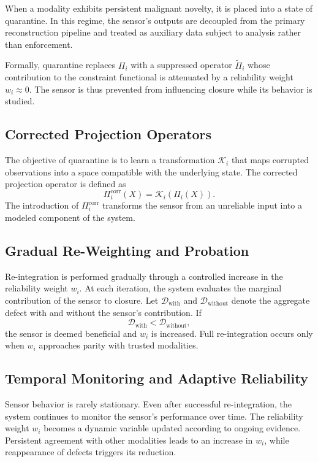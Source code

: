 \documentclass[12pt, oneside]{article}
\begin{document}
When a modality exhibits persistent malignant novelty, it is placed into a state of quarantine. In this regime, the sensor's outputs are decoupled from the primary reconstruction pipeline and treated as auxiliary data subject to analysis rather than enforcement.

Formally, quarantine replaces $\Pi_i$ with a suppressed operator $\tilde{\Pi}_i$ whose contribution to the constraint functional is attenuated by a reliability weight $w_i \approx 0$. The sensor is thus prevented from influencing closure while its behavior is studied.

\subsection{Corrected Projection Operators}

The objective of quarantine is to learn a transformation $\mathcal{K}_i$ that maps corrupted observations into a space compatible with the underlying state. The corrected projection operator is defined as
\[
\Pi_i^{\text{corr}}(X) = \mathcal{K}_i(\Pi_i(X)).
\]
The introduction of $\Pi_i^{\text{corr}}$ transforms the sensor from an unreliable input into a modeled component of the system.

\subsection{Gradual Re-Weighting and Probation}

Re-integration is performed gradually through a controlled increase in the reliability weight $w_i$. At each iteration, the system evaluates the marginal contribution of the sensor to closure. Let $\mathcal{D}_{\text{with}}$ and $\mathcal{D}_{\text{without}}$ denote the aggregate defect with and without the sensor's contribution. If
\[
\mathcal{D}_{\text{with}} < \mathcal{D}_{\text{without}},
\]
the sensor is deemed beneficial and $w_i$ is increased. Full re-integration occurs only when $w_i$ approaches parity with trusted modalities.

\subsection{Temporal Monitoring and Adaptive Reliability}

Sensor behavior is rarely stationary. Even after successful re-integration, the system continues to monitor the sensor's performance over time. The reliability weight $w_i$ becomes a dynamic variable updated according to ongoing evidence. Persistent agreement with other modalities leads to an increase in $w_i$, while reappearance of defects triggers its reduction.
\end{document}
